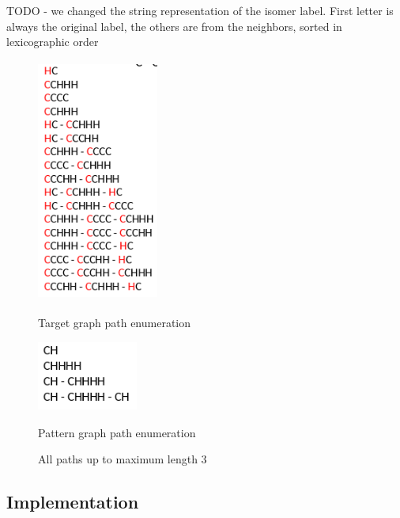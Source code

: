\documentclass{l4proj}
\theoremstyle{definition}
\begin{document}
TODO
  - we changed the string representation of the isomer label. First letter is always the original label, the others are from the neighbors, sorted in lexicographic order\\
\begin{figure}[h]
\centering
\begin{minipage}[t]{.5\textwidth}
  \centering
  \includegraphics[height=8cm,width=4cm]{images/paths/C5H12-isomer.png}
  \caption{Target graph path enumeration}
  \label{C5H12-isomer-paths}
\end{minipage}%
\begin{minipage}[t]{.5\textwidth}
  \centering
  \includegraphics[height=2.3cm,width=3.3cm]{images/paths/CH4-isomer.png}
  \caption{Pattern graph path enumeration}
  \label{CH3-isomer-paths}
\end{minipage}
\caption{All paths up to maximum length 3}
\label{isomer-paths-enumeration}
\end{figure}
\subsection{Implementation}
       
\end{document}

